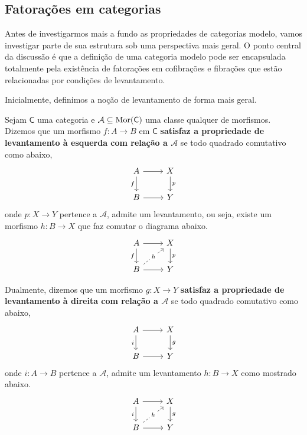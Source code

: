 \subsection{Fatorações em categorias}

Antes de investigarmos mais a fundo as propriedades de categorias modelo, vamos investigar parte de sua estrutura sob uma perspectiva mais geral.
O ponto central da discussão é que a definição de uma categoria modelo pode ser encapsulada totalmente pela existência de fatorações em cofibrações e fibrações que estão relacionadas por condições de levantamento.

Inicialmente, definimos a noção de levantamento de forma mais geral.

\begin{defin}
  Sejam $\mathsf{C}$ uma categoria e $\mathcal{A} \subseteq \mathrm{Mor}(\mathsf{C})$ uma classe qualquer de morfismos.
  Dizemos que um morfismo $f: A \to B$ em $\mathsf{C}$ \textbf{satisfaz a propriedade de levantamento à esquerda com relação a $\mathcal{A}$} se todo quadrado comutativo como abaixo,
  \begin{displaymath}
    \begin{tikzcd}
      A
      \arrow[r]
      \arrow[d, "f" swap]
      & X
      \arrow[d, "p"]
      \\ B
      \arrow[r]
      & Y
    \end{tikzcd}
  \end{displaymath}
  onde $p: X \to Y$ pertence a $\mathcal{A}$, admite um levantamento, ou seja, existe um morfismo $h: B \to X$ que faz comutar o diagrama abaixo.
  \begin{displaymath}
    \begin{tikzcd}
      A
      \arrow[r]
      \arrow[d, "f" swap]
      & X
      \arrow[d, "p"]
      \\ B
      \arrow[r]
      \arrow[ru, dashed, "h" description]
      & Y
    \end{tikzcd}
  \end{displaymath}

  Dualmente, dizemos que um morfismo $g: X \to Y$ \textbf{satisfaz a propriedade de levantamento à direita com relação a $\mathcal{A}$} se todo quadrado comutativo como abaixo,
  \begin{displaymath}
    \begin{tikzcd}
      A
      \arrow[d, "i" swap]
      \arrow[r]
      & X
      \arrow[d, "g"]
      \\ B
      \arrow[r]
      & Y
    \end{tikzcd}
  \end{displaymath}
  onde $i: A \to B$ pertence a $\mathcal{A}$, admite um levantamento $h: B \to X$ como mostrado abaixo.
  \begin{displaymath}
    \begin{tikzcd}
      A
      \arrow[r]
      \arrow[d, "i" swap]
      & X
      \arrow[d, "g"]
      \\ B
      \arrow[r]
      \arrow[ru, dashed, "h" description]
      & Y
    \end{tikzcd}
  \end{displaymath}
\end{defin}

